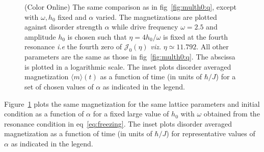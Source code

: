 \documentclass[a4paper,10pt]{article}
\begin{document}
\begin{figure}		
\caption{(Color Online) The same comparison as in fig~\ref{fig:multh0:q}, except with $\omega, h_0$ fixed and $\alpha$ varied. The magnetizations are plotted against disorder strength $\alpha$ while drive frequency $\omega = 2.5$ and amplitude $h_0$ is chosen such that $\eta=4h_0/\omega$ is fixed at the fourth resonance \textit{i.e} the fourth zero of $\mathcal{J}_0(\eta)$ \textit{viz.} $\eta\simeq11.792$.
All other parameters are the same as those in fig~\ref{fig:multh0:q}. The abscissa is plotted in a logarithmic scale. The inset plots disorder averaged magnetization $\langle m\rangle (t)$ as a function of time (in units of $\hbar/J$) for a set of chosen values of $\alpha$ as indicated in the legend.}		
\label{fig:multalpha:q}		
\end{figure}

Figure~\ref{fig:multalpha:q} plots the same magnetization for the same lattice parameters and initial condition as a function of $\alpha$ for a fixed large value of $h_0$ with $\omega$ obtained from the resonance condition in eq~\ref{eq:freezing}. The inset plots disorder averaged magnetization as a function of time (in units of $\hbar/J$) for representative values of $\alpha$ as indicated in the legend.
\end{document}

